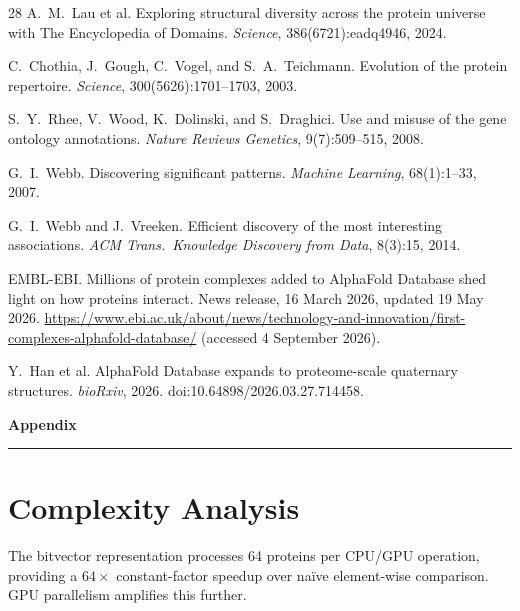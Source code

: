 \documentclass[10pt,a4paper,twocolumn]{article}
\begin{document}
\begin{thebibliography}{28}
A.~M.~Lau et al.
\newblock Exploring structural diversity across the protein universe with The Encyclopedia of Domains.
\newblock \emph{Science}, 386(6721):eadq4946, 2024.

C.~Chothia, J.~Gough, C.~Vogel, and S.~A.~Teichmann.
\newblock Evolution of the protein repertoire.
\newblock \emph{Science}, 300(5626):1701--1703, 2003.

S.~Y.~Rhee, V.~Wood, K.~Dolinski, and S.~Draghici.
\newblock Use and misuse of the gene ontology annotations.
\newblock \emph{Nature Reviews Genetics}, 9(7):509--515, 2008.

G.~I.~Webb.
\newblock Discovering significant patterns.
\newblock \emph{Machine Learning}, 68(1):1--33, 2007.

G.~I.~Webb and J.~Vreeken.
\newblock Efficient discovery of the most interesting associations.
\newblock \emph{ACM Trans.\ Knowledge Discovery from Data}, 8(3):15, 2014.

EMBL-EBI.
\newblock Millions of protein complexes added to AlphaFold Database shed light on how proteins interact.
\newblock News release, 16 March 2026, updated 19 May 2026. \url{https://www.ebi.ac.uk/about/news/technology-and-innovation/first-complexes-alphafold-database/} (accessed 4 September 2026).

Y.~Han et al.
\newblock AlphaFold Database expands to proteome-scale quaternary structures.
\newblock \emph{bioRxiv}, 2026. doi:10.64898/2026.03.27.714458.

\end{thebibliography}

\clearpage
\appendix
\onecolumn

\begin{center}
{\Large\bfseries Appendix}
\end{center}
\vspace{0.5em}
\hrule
\vspace{1.5em}

\section{Complexity Analysis}
\label{app:complexity}

The bitvector representation processes 64 proteins per CPU/GPU operation, providing a $64\times$ constant-factor speedup over na\"ive element-wise comparison. GPU parallelism amplifies this further.
\end{document}
